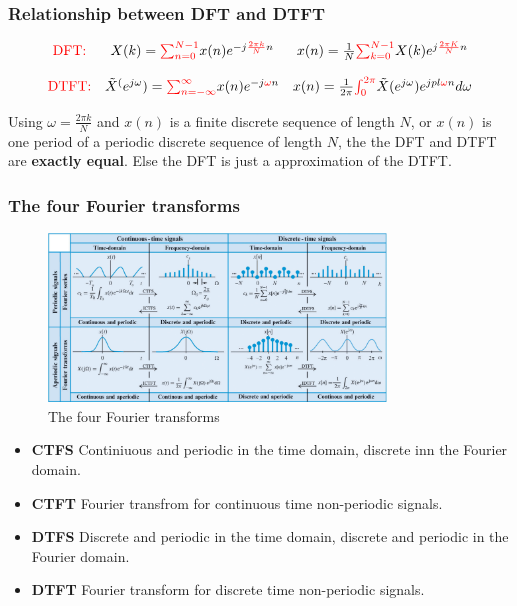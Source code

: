 \documentclass{article}
\begin{document}
\subsubsection{Relationship between DFT and DTFT}

\begin{align}
    \begin{matrix}
        \textcolor{red}{\text{DFT:}} & X(k) = \textcolor{red}{\sum_{n=0}^{N-1}} x(n)e^{-j\textcolor{red}{\frac{2\pi k}{N}}n} & x(n) = \frac{1}{N}\textcolor{red}{\sum_{k=0}^{N-1}}X(k)e^{j\textcolor{red}{\frac{2\pi K}{N}}n} \\ \\
        \textcolor{red}{\text{DTFT:}} & \tilde{X}^(e^{j\omega}) = \textcolor{red}{\sum_{n=-\infty}^{\infty}} x(n)e^{-j\textcolor{red}{\omega} n} & x(n) = \frac{1}{2\pi}\textcolor{red}{\int_{0}^{2\pi}}\tilde{X}(e^{j\omega})e^{jpl \textcolor{red}{\omega} n} d\omega
    \end{matrix}
\end{align}

Using $\omega = \frac{2\pi k}{N}$ and $x(n)$ is a finite discrete sequence of length $N$, or $x(n)$ is one period of a periodic discrete sequence of length $N$, the the DFT and DTFT are \textbf{exactly equal}. Else the DFT is just a approximation of the DTFT.

\subsubsection{The four Fourier transforms}
\begin{figure}[h!]
    \centering
    \includegraphics[width=0.8\textwidth]{figures/DFT/fourier_reps.png}
    \caption{The four Fourier transforms}
    \label{fig:furry_transforms}
\end{figure}

\begin{itemize}
    \item \textbf{CTFS} Continiuous and periodic in the time domain, discrete inn the Fourier domain.
    \item \textbf{CTFT} Fourier transfrom for continuous time non-periodic signals.
    \item \textbf{DTFS} Discrete and periodic in the time domain, discrete and periodic in the Fourier domain.
    \item \textbf{DTFT} Fourier transform for discrete time non-periodic signals.
\end{itemize}
\end{document}
